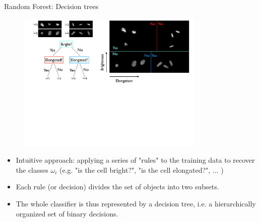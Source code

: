\documentclass[xcolor=pdftex,dvipsnames,table]{beamer}
\begin{document}
\begin{frame}{Random Forest: Decision trees}
\begin{figure}[htb]
\includegraphics[width=0.8\textwidth]{../graphics/CellClassification_RF.pdf}
\end{figure}

\begin{itemize}
	\item Intuitive approach: applying a series of "rules" to the training data to recover the classes $\omega_i$ (e.g. "is the cell bright?", "is the cell elongated?", ... ) 	
	\item Each rule (or decision) divides the set of objects into two subsets. 
	\item The whole classifier is thus represented by a decision tree, i.e. a hierarchically organized set of binary decisions.
\end{itemize}
	
\end{frame}
\end{document}
